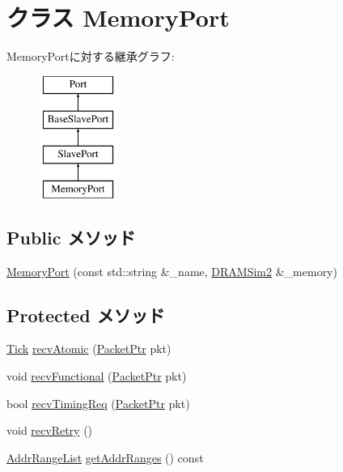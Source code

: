 \hypertarget{classDRAMSim2_1_1MemoryPort}{
\section{クラス MemoryPort}
\label{classDRAMSim2_1_1MemoryPort}
}
MemoryPortに対する継承グラフ:\begin{figure}[H]
\begin{center}
\leavevmode
\includegraphics[height=4cm]{classDRAMSim2_1_1MemoryPort}
\end{center}
\end{figure}
\subsection*{Public メソッド}
\begin{DoxyCompactItemize}
\item 
\hyperlink{classDRAMSim2_1_1MemoryPort_aad388e23839cbb0ef7806448934f31c0}{MemoryPort} (const std::string \&\_\-name, \hyperlink{classDRAMSim2_1_1DRAMSim2}{DRAMSim2} \&\_\-memory)
\end{DoxyCompactItemize}
\subsection*{Protected メソッド}
\begin{DoxyCompactItemize}
\item 
\hyperlink{base_2types_8hh_a5c8ed81b7d238c9083e1037ba6d61643}{Tick} \hyperlink{classDRAMSim2_1_1MemoryPort_a5f0b4c4a94f6b0053f9d7a4eb9c2518a}{recvAtomic} (\hyperlink{classPacket}{PacketPtr} pkt)
\item 
void \hyperlink{classDRAMSim2_1_1MemoryPort_aeefa907fb6d6a787e6dab90e8138ea90}{recvFunctional} (\hyperlink{classPacket}{PacketPtr} pkt)
\item 
bool \hyperlink{classDRAMSim2_1_1MemoryPort_a3344d9dd0f83257feab5424e761f31c6}{recvTimingReq} (\hyperlink{classPacket}{PacketPtr} pkt)
\item 
void \hyperlink{classDRAMSim2_1_1MemoryPort_a29cb5a4f98063ce6e9210eacbdb35298}{recvRetry} ()
\item 
\hyperlink{classstd_1_1list}{AddrRangeList} \hyperlink{classDRAMSim2_1_1MemoryPort_a36cf113d5e5e091ebddb32306c098fae}{getAddrRanges} () const 
\end{DoxyCompactItemize}

